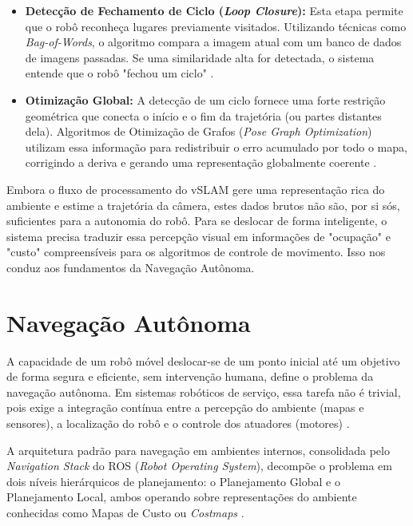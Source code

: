 \begin{itemize}
    \item \textbf{Detecção de Fechamento de Ciclo (\textit{Loop Closure}):} Esta etapa permite que o robô reconheça lugares previamente visitados. Utilizando técnicas como \textit{Bag-of-Words}, o algoritmo compara a imagem atual com um banco de dados de imagens passadas. Se uma similaridade alta for detectada, o sistema entende que o robô "fechou um ciclo" \cite{mur-artal2015orbslamversatileaccurate}.
    
    \item \textbf{Otimização Global:} A detecção de um ciclo fornece uma forte restrição geométrica que conecta o início e o fim da trajetória (ou partes distantes dela). Algoritmos de Otimização de Grafos (\textit{Pose Graph Optimization}) utilizam essa informação para redistribuir o erro acumulado por todo o mapa, corrigindo a deriva e gerando uma representação globalmente coerente \cite{mokssit2023deeplearningtechniques}.
\end{itemize}

Embora o fluxo de processamento do vSLAM gere uma representação rica do ambiente e estime a trajetória da câmera, estes dados brutos não são, por si sós, suficientes para a autonomia do robô. Para se deslocar de forma inteligente, o sistema precisa traduzir essa percepção visual em informações de "ocupação" e "custo" compreensíveis para os algoritmos de controle de movimento. Isso nos conduz aos fundamentos da Navegação Autônoma.

\section{Navegação Autônoma}
\label{sec:navegacao}

A capacidade de um robô móvel deslocar-se de um ponto inicial até um objetivo de forma segura e eficiente, sem intervenção humana, define o problema da navegação autônoma. Em sistemas robóticos de serviço, essa tarefa não é trivial, pois exige a integração contínua entre a percepção do ambiente (mapas e sensores), a localização do robô e o controle dos atuadores (motores) \cite{macenski2020marathon2navigation}.

A arquitetura padrão para navegação em ambientes internos, consolidada pelo \textit{Navigation Stack} do ROS (\textit{Robot Operating System}), decompõe o problema em dois níveis hierárquicos de planejamento: o Planejamento Global e o Planejamento Local, ambos operando sobre representações do ambiente conhecidas como Mapas de Custo ou \textit{Costmaps} \cite{marder-eppstein2010officemarathonrobust}.

